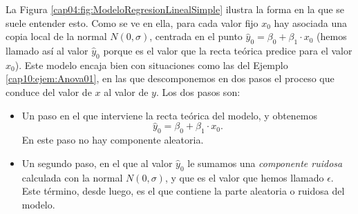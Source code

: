 La Figura \ref{cap04:fig:ModeloRegresionLinealSimple} ilustra la forma en la que se suele entender
esto. Como se ve en ella, para cada valor fijo $x_0$ hay asociada una copia local de la normal
$N(0,\sigma)$, centrada en el punto  $\hat y_0=\beta_0+\beta_1\cdot x_0$ (hemos llamado así al
valor $\hat y_0$ porque es el valor que la recta teórica predice para el valor $x_0$). Este modelo
encaja bien con situaciones como las del Ejemplo \ref{cap10:ejem:Anova01}, en las que descomponemos
en dos pasos el proceso que conduce del valor de $x$ al valor de $y$. Los dos pasos son:
\begin{itemize}
  \item Un paso en el que interviene la recta teórica del modelo, y obtenemos
    \[\hat y_0=\beta_0+\beta_1\cdot x_0.\]
    En este paso no hay componente aleatoria.
  \item Un segundo paso, en el que al valor $\hat y_0$ le sumamos una {\em componente ruidosa}
      calculada con la normal $N(0,\sigma)$, y que es el valor que hemos llamado $\epsilon$. Este
      término, desde luego, es el que contiene la parte aleatoria o ruidosa del modelo.
\end{itemize}

